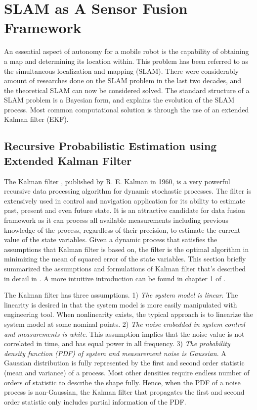 \section{SLAM as A Sensor Fusion Framework}
\label{sec:SLAM}
An essential aspect of autonomy for a mobile robot is the capability
of obtaining a map and determining its location within. This problem
has been referred to as the simultaneous localization and mapping
(SLAM). There were considerably amount of researches done on the SLAM
problem in the last two decades, and the theoretical SLAM can now be
considered solved. The standard structure of a SLAM problem is a
Bayesian form, and explains the evolution of the SLAM process. Most
common computational solution is through the use of an extended
Kalman filter (EKF).

\subsection{Recursive Probabilistic Estimation using Extended Kalman Filter}
\label{sec:SLAM_using_EKF}

The Kalman filter \cite{kalman_new_1960}, published by R. E. Kalman in
1960, is a very powerful recursive data processing algorithm for
dynamic stochastic processes. The filter is extensively used in
control and navigation application for its ability to estimate past,
present and even future state. It is an attractive candidate for data
fusion framework as it can process all available measurements
including previous knowledge of the process, regardless of their
precision, to estimate the current value of the state variables.
Given a dynamic process that satisfies the assumptions that Kalman
filter is based on, the filter is the optimal algorithm in minimizing
the mean of squared error of the state variables. This section briefly
summarized the assumptions and formulations of Kalman filter that's
described in detail in \cite{sorenson_least-squares_1970}
\cite{analytic_sciences_corporation_applied_1974}
\cite{grewal_kalman_1993} \cite{lewis_optimal_1986}
\cite{brown_introduction_1993}. A more intuitive introduction can be
found in chapter 1 of \cite{maybeck_stochastic_1979}.


The Kalman filter has three assumptions. 1) \textit{The system model
  is linear}. The linearity is desired in that the system model is
more easily manipulated with engineering tool. When nonlinearity
exists, the typical approach is to linearize the system model at some
nominal points. 2) \textit{The noise embedded in system control and
  measurements is white}. This assumption implies that the noise value
is not correlated in time, and has equal power in all frequency. 3)
\textit{The probability density function (PDF) of system and
  measurement noise is Gaussian}. A Gaussian distribution is fully
represented by the first and second order statistic (mean and
variance) of a process. Most other densities require endless number of
orders of statistic to describe the shape fully. Hence, when the PDF
of a noise process is non-Gaussian, the Kalman filter that propagates
the first and second order statistic only includes partial information
of the PDF.

